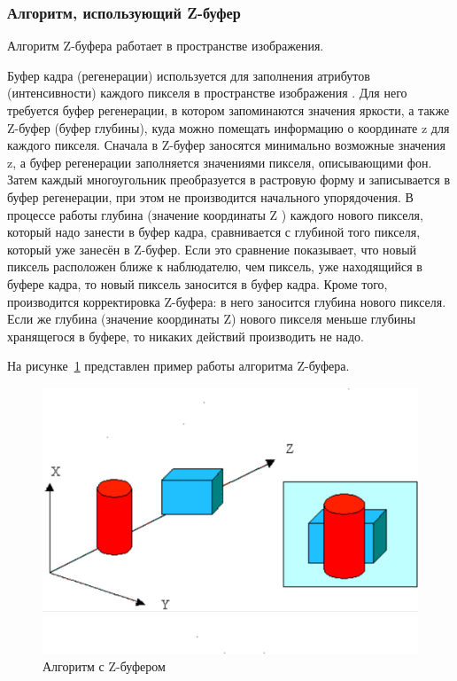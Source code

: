 \subsubsection{Алгоритм, использующий Z-буфер}

Алгоритм Z-буфера работает в пространстве изображения.

Буфер кадра (регенерации) используется для заполнения атрибутов (интенсивности) каждого пикселя в пространстве изображения \cite{roders}.
Для него требуется буфер регенерации, в котором запоминаются значения яркости, а также Z-буфер (буфер глубины), куда можно помещать информацию о координате z для каждого пикселя.
Сначала в Z-буфер заносятся минимально возможные значения z, а буфер регенерации заполняется значениями пикселя, описывающими фон.
Затем каждый многоугольник преобразуется в растровую форму и записывается в буфер регенерации, при этом не производится начального упорядочения.
В процессе работы глубина (значение координаты Z ) каждого нового пикселя, который надо занести в буфер кадра, сравнивается с глубиной того пикселя, который уже занесён в Z-буфер.
Если это сравнение показывает, что новый пиксель расположен ближе к наблюдателю, чем пиксель, уже находящийся в буфере кадра, то новый пиксель заносится в буфер кадра.
Кроме того, производится корректировка Z-буфера: в него заносится глубина нового пикселя.
Если же глубина (значение координаты Z) нового пикселя меньше глубины хранящегося в буфере, то никаких действий производить не надо.

На рисунке~\ref{img:z-buffer} представлен пример работы алгоритма Z-буфера.
\begin{figure}[h]
	\centering
	\includegraphics[height=0.35\textheight]{img/z-buffer.png}
	\caption{Алгоритм с Z-буфером \cite{zbuffer}}
	\label{img:z-buffer}
\end{figure}

